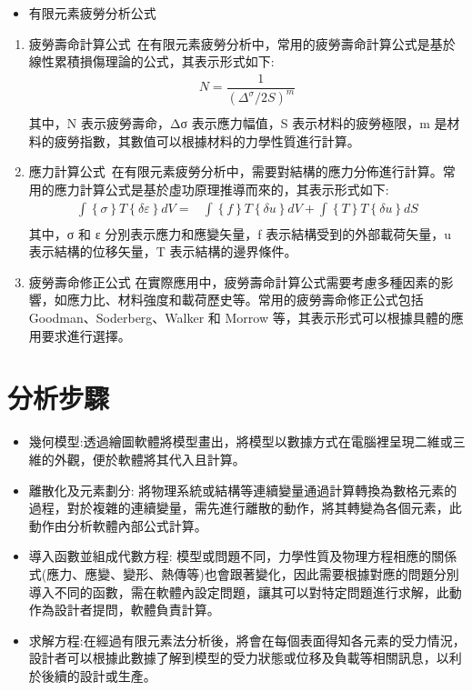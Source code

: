 \begin{itemize}
\item 有限元素疲勞分析公式
\end{itemize}
\begin{enumerate}

\item 疲勞壽命計算公式\
在有限元素疲勞分析中，常用的疲勞壽命計算公式是基於線性累積損傷理論的公式，其表示形式如下:\\
\[
\begin{aligned}
N=\dfrac{1}{\left( \Delta ^{\sigma }/2S\right) ^{m}}\\
\end{aligned}
\]
其中，N 表示疲勞壽命，Δσ 表示應力幅值，S 表示材料的疲勞極限，m 是材料的疲勞指數，其數值可以根據材料的力學性質進行計算。\\

\item 應力計算公式\
在有限元素疲勞分析中，需要對結構的應力分佈進行計算。常用的應力計算公式是基於虛功原理推導而來的，其表示形式如下:\\
\[
\begin{aligned}
\int \left\{ \sigma \right\} T\left\{ \delta \varepsilon \right\} dV=&\int \left\{ f\right\} T\left\{ \delta u\right\} dV+\int \left\{ T\right\} T\left\{ \delta u\right\} dS\\
\end{aligned}
\]
其中，{σ} 和 {ε} 分別表示應力和應變矢量，{f} 表示結構受到的外部載荷矢量，{u} 表示結構的位移矢量，{T} 表示結構的邊界條件。\\

\item 疲勞壽命修正公式
在實際應用中，疲勞壽命計算公式需要考慮多種因素的影響，如應力比、材料強度和載荷歷史等。常用的疲勞壽命修正公式包括 Goodman、Soderberg、Walker 和 Morrow 等，其表示形式可以根據具體的應用要求進行選擇。
\end{enumerate}

\section{分析步驟}
\begin{itemize}
\item 幾何模型:透過繪圖軟體將模型畫出，將模型以數據方式在電腦裡呈現二維或三維的外觀，便於軟體將其代入且計算。
\item 離散化及元素劃分: 將物理系統或結構等連續變量通過計算轉換為數格元素的過程，對於複雜的連續變量，需先進行離散的動作，將其轉變為各個元素，此動作由分析軟體內部公式計算。
\item 導入函數並組成代數方程: 模型或問題不同，力學性質及物理方程相應的關係式(應力、應變、變形、熱傳等)也會跟著變化，因此需要根據對應的問題分別導入不同的函數，需在軟體內設定問題，讓其可以對特定問題進行求解，此動作為設計者提問，軟體負責計算。
\item 求解方程:在經過有限元素法分析後，將會在每個表面得知各元素的受力情況，設計者可以根據此數據了解到模型的受力狀態或位移及負載等相關訊息，以利於後續的設計或生產。
\end{itemize}
\newpage
